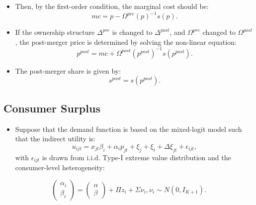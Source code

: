 \documentclass[
]{book}
\providecommand{\tightlist}{%
  \setlength{\itemsep}{0pt}\setlength{\parskip}{0pt}}
\begin{document}
\begin{itemize}
\item
  Then, by the first-order condition, the marginal cost should be:
  \begin{equation}
  mc = p - \Omega^{pre}(p)^{-1} s(p).
  \end{equation}
\item
  If the ownership structure \(\Delta^{pre}\) is changed to \(\Delta^{post}\), and \(\Omega^{pre}\) changed to \(\Omega^{post}\), the post-merger price is determined by solving the non-linear equation:
  \begin{equation}
  p^{post} = mc + \Omega^{post}(p^{post})^{-1}s(p^{post}).
  \end{equation}
\item
  The post-merger share is given by:
  \begin{equation}
  s^{post} = s(p^{post}).
  \end{equation}
\end{itemize}

\hypertarget{consumer-surplus}{%
\subsection{Consumer Surplus}\label{consumer-surplus}}

\begin{itemize}
\tightlist
\item
  Suppose that the demand function is based on the mixed-logit model such that the indirect utility is:
  \begin{equation}
  u_{ijt} = x_{jt} \beta_i + \alpha_i p_{jt} + \xi_{j} + \xi_t + \Delta \xi_{jt} + \epsilon_{ijt},
  \end{equation}
  with \(\epsilon_{ijt}\) is drawn from i.i.d. Type-I extreme value distribution and the consumer-level heterogeneity:
\end{itemize}

\begin{equation}
\begin{pmatrix}
\alpha_i \\
\beta_i
\end{pmatrix}
= 
\begin{pmatrix}
\alpha\\
\beta
\end{pmatrix}
+ \Pi z_i + \Sigma \nu_i, \nu_i \sim N(0, I_{K + 1}).
\end{equation}
\end{document}
